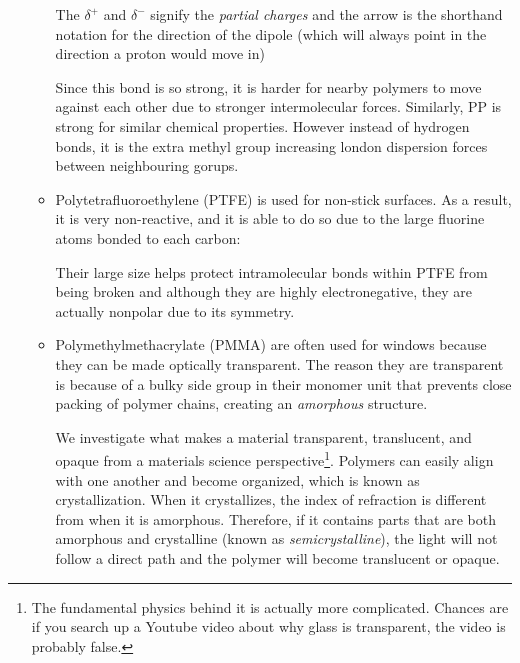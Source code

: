 \begin{itemize}
\begin{itemize}
\begin{case}
        \vspace{4mm}
        \begin{center}
        \end{center}
        \vspace{2mm}
        The $\delta^+$ and $\delta^-$ signify the \textit{partial charges} and the arrow is the shorthand notation for the direction of the dipole (which will always point in the direction a proton would move in)
        \vspace{2mm}

        Since this bond is so strong, it is harder for nearby polymers to move against each other due to stronger intermolecular forces. Similarly, PP is strong for similar chemical properties. However instead of hydrogen bonds, it is the extra methyl group increasing london dispersion forces between neighbouring gorups.
    \end{case}
    \item Polytetrafluoroethylene (PTFE) is used for non-stick surfaces. As a result, it is very non-reactive, and it is able to do so due to the large fluorine atoms bonded to each carbon:
    \begin{center}
    \end{center}
    Their large size helps protect intramolecular bonds within PTFE from being broken and although they are highly electronegative, they are actually nonpolar due to its symmetry.
    \item Polymethylmethacrylate (PMMA) are often used for windows because they can be made optically transparent. The reason they are transparent is because of a bulky side group in their monomer unit that prevents close packing of polymer chains, creating an \textit{amorphous} structure.
    \begin{center}
    \end{center}
    \begin{case}
        We investigate what makes a material transparent, translucent, and opaque from a materials science perspective\footnote{The fundamental physics behind it is actually more complicated. Chances are if you search up a Youtube video about why glass is transparent, the video is probably false.}. Polymers can easily align with one another and become organized, which is known as crystallization. When it crystallizes, the index of refraction is different from when it is amorphous. Therefore, if it contains parts that are both amorphous and crystalline (known as \textit{semicrystalline}), the light will not follow a direct path and the polymer will become translucent or opaque.

\end{case}
\end{itemize}
\end{itemize}
